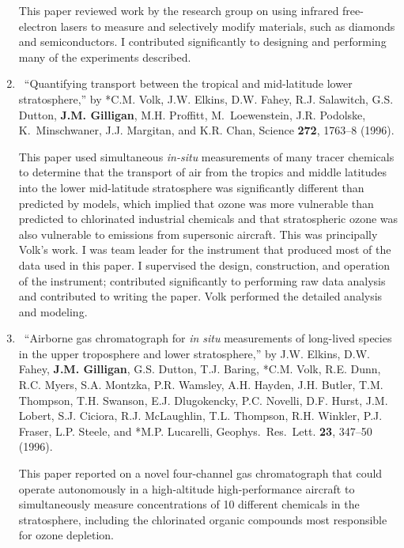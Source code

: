 \begin{enumerate}
\begin{credit}
	   This paper reviewed work by the research group on using infrared free-electron lasers to measure and selectively modify materials, such as diamonds and semiconductors.
	  I contributed significantly to designing and performing many of the experiments described.
	  \end{credit}
%	
	\item
	\textdagger\ 
	\enquote{Quantifying transport between the tropical and mid-latitude lower
	  stratosphere,}  by *C.M. Volk, J.W. Elkins, D.W. Fahey, R.J. Salawitch,
	  G.S. Dutton, \textbf{J.M. Gilligan}, M.H. Proffitt, M.~Loewenstein, J.R. Podolske,
	  K.~Minschwaner, J.J. Margitan, and K.R. Chan, Science \textbf{272}, 1763--8
	  (1996).
	  \begin{credit}
	  This paper used simultaneous \emph{in-situ\/} measurements of many tracer chemicals to determine that the transport of air from the tropics and middle latitudes into the lower mid-latitude stratosphere was significantly different than predicted by models, which implied that ozone was more vulnerable than predicted to chlorinated industrial chemicals and that stratospheric ozone was also vulnerable to emissions from supersonic aircraft.
	  This was principally Volk's work. I was team leader for the instrument that produced most of the data used in this paper. I supervised the design, construction, and operation of the instrument; contributed significantly to performing raw data analysis and contributed to writing the paper. Volk performed the detailed analysis and modeling. 
	  \end{credit}
%	
	\item
	\textdagger\ 
	\enquote{Airborne gas chromatograph for \emph{in situ\/} measurements of
	  long-lived species in the upper troposphere and lower stratosphere,}  by
	  J.W. Elkins, D.W. Fahey, \textbf{J.M. Gilligan}, G.S. Dutton, T.J. Baring, *C.M.
	  Volk, R.E. Dunn, R.C. Myers, S.A. Montzka, P.R. Wamsley, A.H. Hayden,
	  J.H. Butler, T.M. Thompson, T.H. Swanson, E.J. Dlugokencky, P.C.
	  Novelli, D.F. Hurst, J.M. Lobert, S.J. Ciciora, R.J. McLaughlin, T.L.
	  Thompson, R.H. Winkler, P.J. Fraser, L.P. Steele, and *M.P. Lucarelli,
	  Geophys.\ Res.\ Lett. \textbf{23}, 347--50 (1996). 
	  \begin{credit}
	  This paper reported on a novel four-channel gas chromatograph that could operate autonomously in a high-altitude high-performance aircraft to simultaneously measure concentrations of 10 different chemicals in the stratosphere, including the chlorinated organic compounds most responsible for ozone depletion.

\end{credit}
\end{enumerate}
